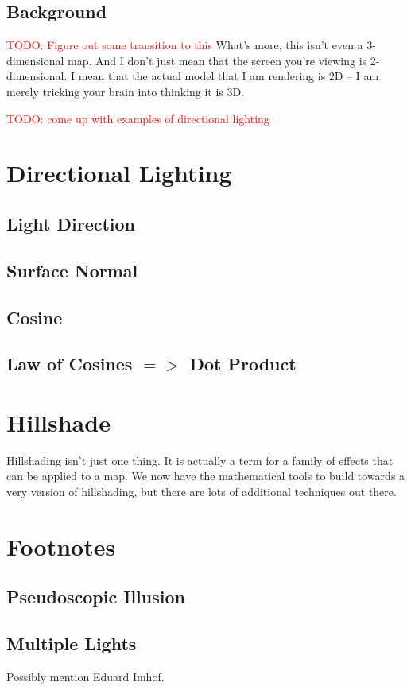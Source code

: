 \documentclass{article}
\newcommand\todo[1]{\textcolor{red}{TODO: #1}}
\begin{document}
\subsection{Background}

\todo{Figure out some transition to this}
What's more, this isn't even a 3-dimensional map.
And I don't just mean that the screen you're viewing is 2-dimensional.
I mean that the actual model that I am rendering is 2D -- I am merely tricking your brain into thinking it is 3D.

\todo{come up with examples of directional lighting}

\section{Directional Lighting}

\subsection{Light Direction}

\subsection{Surface Normal}

\subsection{Cosine}

\subsection{Law of Cosines $=>$ Dot Product}

\section{Hillshade}

Hillshading isn't just one thing.
It is actually a term for a family of effects that can be applied to a map.
We now have the mathematical tools to build towards a very version of hillshading, but there are lots of additional techniques out there.

\section{Footnotes}

\subsection{Pseudoscopic Illusion}

\subsection{Multiple Lights}

Possibly mention Eduard Imhof.
	
\end{document}
